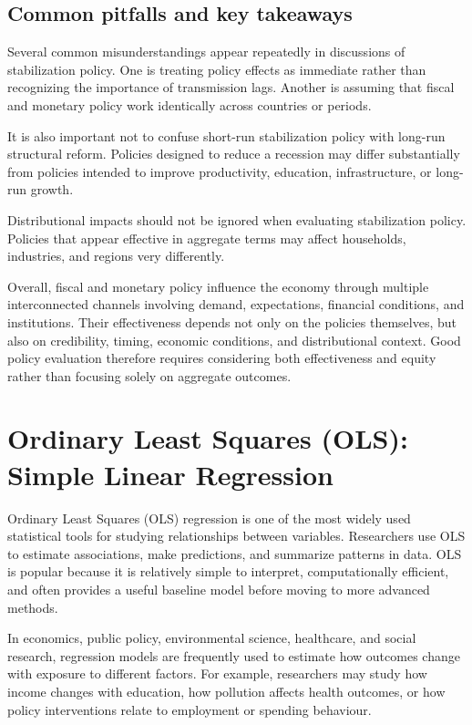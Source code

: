 \documentclass[
  11pt,
  oneside]{book}
\begin{document}
\section{Common pitfalls and key takeaways}\label{common-pitfalls-and-key-takeaways-2}

Several common misunderstandings appear repeatedly in discussions of stabilization policy. One is treating policy effects as immediate rather than recognizing the importance of transmission lags. Another is assuming that fiscal and monetary policy work identically across countries or periods.

It is also important not to confuse short-run stabilization policy with long-run structural reform. Policies designed to reduce a recession may differ substantially from policies intended to improve productivity, education, infrastructure, or long-run growth.

Distributional impacts should not be ignored when evaluating stabilization policy. Policies that appear effective in aggregate terms may affect households, industries, and regions very differently.

Overall, fiscal and monetary policy influence the economy through multiple interconnected channels involving demand, expectations, financial conditions, and institutions. Their effectiveness depends not only on the policies themselves, but also on credibility, timing, economic conditions, and distributional context. Good policy evaluation therefore requires considering both effectiveness and equity rather than focusing solely on aggregate outcomes.

\chapter{Ordinary Least Squares (OLS): Simple Linear Regression}\label{ols}

Ordinary Least Squares (OLS) regression is one of the most widely used statistical tools for studying relationships between variables. Researchers use OLS to estimate associations, make predictions, and summarize patterns in data. OLS is popular because it is relatively simple to interpret, computationally efficient, and often provides a useful baseline model before moving to more advanced methods.

In economics, public policy, environmental science, healthcare, and social research, regression models are frequently used to estimate how outcomes change with exposure to different factors. For example, researchers may study how income changes with education, how pollution affects health outcomes, or how policy interventions relate to employment or spending behaviour.
\end{document}

